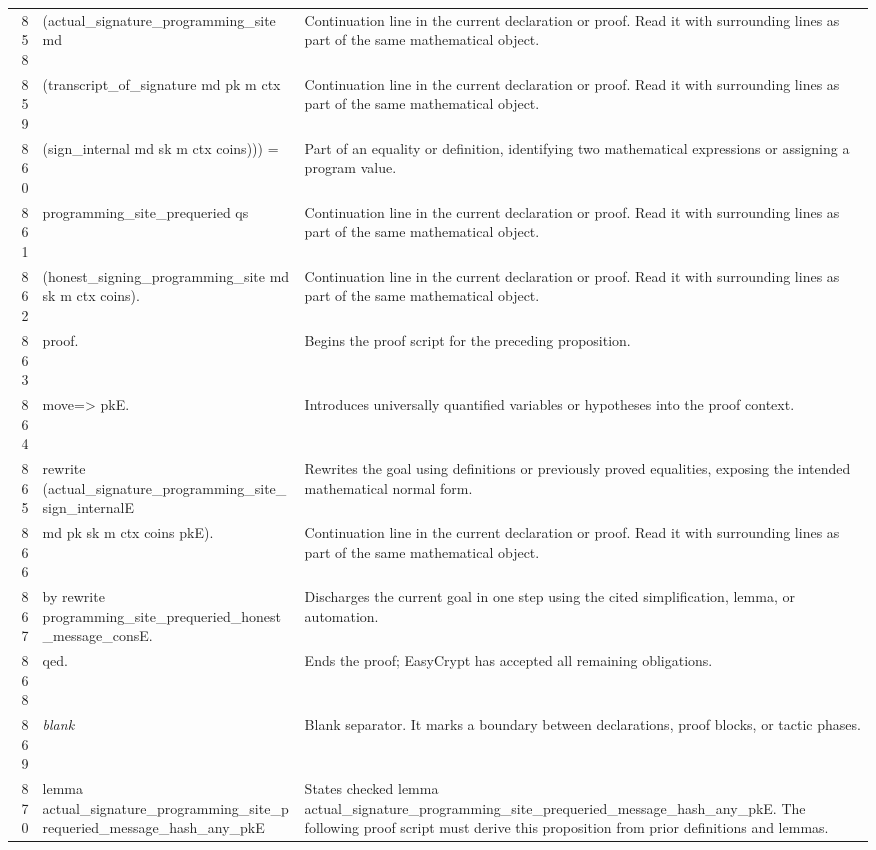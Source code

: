\documentclass[10pt]{article}
\begin{document}
\begin{longtable}{r L{0.53\textwidth} L{0.37\textwidth}}
858 & {\ttfamily\scriptsize     (actual\_signature\_programming\_site md} & Continuation line in the current declaration or proof.  Read it with surrounding lines as part of the same mathematical object. \\
859 & {\ttfamily\scriptsize       (transcript\_of\_signature md pk m ctx} & Continuation line in the current declaration or proof.  Read it with surrounding lines as part of the same mathematical object. \\
860 & {\ttfamily\scriptsize         (sign\_internal md sk m ctx coins))) =} & Part of an equality or definition, identifying two mathematical expressions or assigning a program value. \\
861 & {\ttfamily\scriptsize   programming\_site\_prequeried qs} & Continuation line in the current declaration or proof.  Read it with surrounding lines as part of the same mathematical object. \\
862 & {\ttfamily\scriptsize     (honest\_signing\_programming\_site md sk m ctx coins).} & Continuation line in the current declaration or proof.  Read it with surrounding lines as part of the same mathematical object. \\
863 & {\ttfamily\scriptsize proof.} & Begins the proof script for the preceding proposition. \\
864 & {\ttfamily\scriptsize move=> pkE.} & Introduces universally quantified variables or hypotheses into the proof context. \\
865 & {\ttfamily\scriptsize rewrite (actual\_signature\_programming\_site\_sign\_internalE} & Rewrites the goal using definitions or previously proved equalities, exposing the intended mathematical normal form. \\
866 & {\ttfamily\scriptsize            md pk sk m ctx coins pkE).} & Continuation line in the current declaration or proof.  Read it with surrounding lines as part of the same mathematical object. \\
867 & {\ttfamily\scriptsize by rewrite programming\_site\_prequeried\_honest\_message\_consE.} & Discharges the current goal in one step using the cited simplification, lemma, or automation. \\
868 & {\ttfamily\scriptsize qed.} & Ends the proof; EasyCrypt has accepted all remaining obligations. \\
869 & {\ttfamily\scriptsize \emph{blank}} & Blank separator.  It marks a boundary between declarations, proof blocks, or tactic phases. \\
870 & {\ttfamily\scriptsize lemma actual\_signature\_programming\_site\_prequeried\_message\_hash\_any\_pkE} & States checked lemma actual\_signature\_programming\_site\_prequeried\_message\_hash\_any\_pkE.  The following proof script must derive this proposition from prior definitions and lemmas. \\

\end{longtable}
\end{document}
